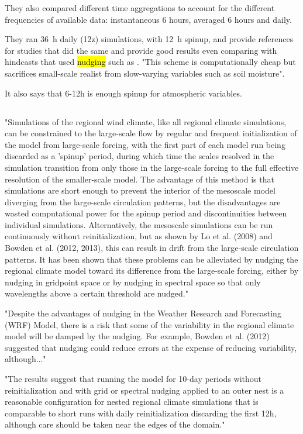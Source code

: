 \documentclass[12pt,a4paper]{article}
\begin{document}
They also compared different time aggregations to account for the different frequencies of available data: instantaneous 6 hours, averaged 6 hours and daily.

They ran 36~h daily (12z) simulations, with 12~h spinup, and provide references for studies that did the same and provide good results even comparing with hindcasts that used \hl{nudging} such as \cite{Menendez2014a}. "This scheme is computationally cheap but sacrifices small-scale realist from slow-varying variables such as soil moisture".  

It also says that 6-12h is enough spinup for atmospheric variables.

\subsection{\cite{Vincent2015}}

"Simulations of the regional wind climate, like all regional climate simulations, can be constrained to the large-scale flow by regular and frequent initialization of the model from large-scale forcing, with the first part of each model run being discarded as a 'spinup’ period, during which time the scales resolved in the simulation transition from only those in the large-scale forcing to the full effective resolution of the smaller-scale model. The advantage of this method is that simulations are short enough to prevent the interior of the mesoscale model diverging from the large-scale circulation patterns, but the disadvantages are wasted computational power for the spinup period and discontinuities between individual simulations. Alternatively, the mesoscale simulations can be run continuously without reinitialization, but as shown by Lo et al. (2008) and Bowden et al. (2012, 2013), this can result in drift from the large-scale circulation patterns. It has been shown that these problems can be alleviated by nudging the regional climate model toward its difference from the large-scale forcing, either by nudging in gridpoint space or by nudging in spectral space so that only wavelengths above a certain threshold are nudged."

"Despite the advantages of nudging in the Weather Research and Forecasting (WRF) Model, there is a risk that some of the variability in the regional climate model will be damped by the nudging. For example, Bowden et al. (2012) suggested that nudging could reduce errors at the expense of reducing variability, although..."

"The results suggest that running the model for 10-day periods without reinitialization and with grid or spectral nudging applied to an outer nest is a reasonable configuration for nested regional climate simulations that is comparable to short runs with daily reinitialization discarding the first 12h, although care should be taken near the edges of the domain."
\end{document}
